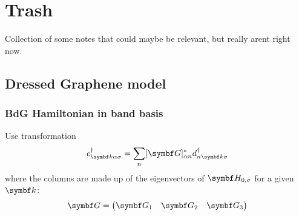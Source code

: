 \documentclass[../notes.tex]{subfiles}
\begin{document}
\chapter{Trash}

Collection of some notes that could maybe be relevant, but really arent right now.

\section{Dressed Graphene model}

\subsection{BdG Hamiltonian in band basis}

Use transformation
\begin{equation}
	c_{\vb{k} \alpha \sigma}^{\dagger} = \sum_{n} [\mat{G}]_{\alpha n}^* d_{n \vb{k} \sigma}^{\dagger}
\end{equation}
where the columns are made up of the eigenvectors of \(\mat{H}_{0, \sigma}\) for a given \(\vb{k}\):
\begin{equation}
	\mat{G} = 
	\begin{pmatrix}
		\vb{G}_1 & \vb{G}_2 & \vb{G}_3
	\end{pmatrix}
\end{equation}
\end{document}
